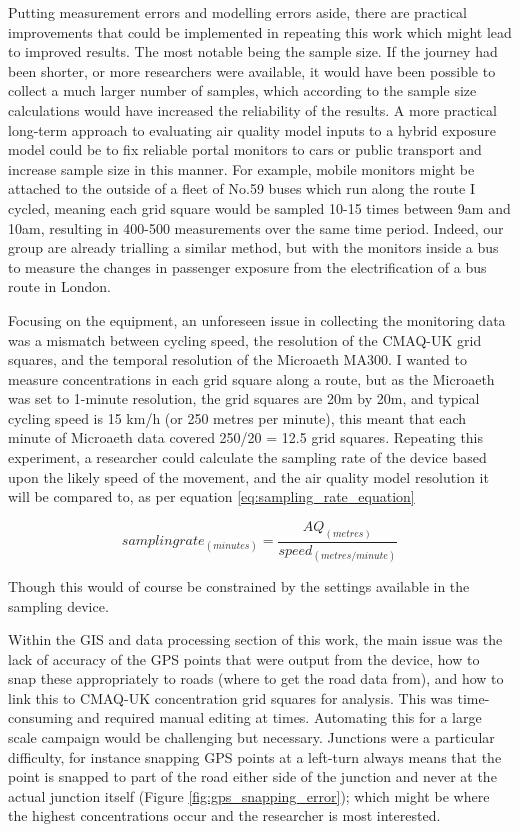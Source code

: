 Putting measurement errors and modelling errors aside, there are practical improvements that could be implemented in repeating this work which might lead to improved results. The most notable being the sample size. If the journey had been shorter, or more researchers were available, it would have been possible to collect a much larger number of samples, which according to the sample size calculations would have increased the reliability of the results. A more practical long-term approach to evaluating air quality model inputs to a hybrid exposure model could be to fix reliable portal monitors to cars or public transport and increase sample size in this manner. For example, mobile monitors might be attached to the outside of a fleet of No.59 buses which run along the route I cycled, meaning each grid square would be sampled 10-15 times between 9am and 10am, resulting in 400-500 measurements over the same time period. Indeed, our group are already trialling a similar method, but with the monitors inside a bus to measure the changes in passenger exposure from the electrification of a bus route in London.

Focusing on the equipment, an unforeseen issue in collecting the monitoring data was a mismatch between cycling speed, the resolution of the CMAQ-UK grid squares, and the temporal resolution of the Microaeth MA300. I wanted to measure concentrations in each grid square along a route, but as the Microaeth was set to 1-minute resolution, the grid squares are 20m by 20m, and typical cycling speed is 15 km/h (or 250 metres per minute), this meant that each minute of Microaeth data covered 250/20 = 12.5 grid squares. Repeating this experiment, a researcher could calculate the sampling rate of the device based upon the likely speed of the movement, and the air quality model resolution it will be compared to, as per equation \ref{eq:sampling_rate_equation}

\begin{equation}
  sampling rate_{(minutes)} = \frac{AQ_{(metres)}}{speed_{(metres/minute)}}
  \label{eq:sampling_rate_equation}
\end{equation}

Though this would of course be constrained by the settings available in the sampling device.

Within the GIS and data processing section of this work, the main issue was the lack of accuracy of the GPS points that were output from the device, how to snap these appropriately to roads (where to get the road data from), and how to link this to CMAQ-UK concentration grid squares for analysis. This was time-consuming and required manual editing at times. Automating this for a large scale campaign would be challenging but necessary. Junctions were a particular difficulty, for instance snapping GPS points at a left-turn always means that the point is snapped to part of the road either side of the junction and never at the actual junction itself (Figure \ref{fig:gps_snapping_error}); which might be where the highest concentrations occur and the researcher is most interested.

